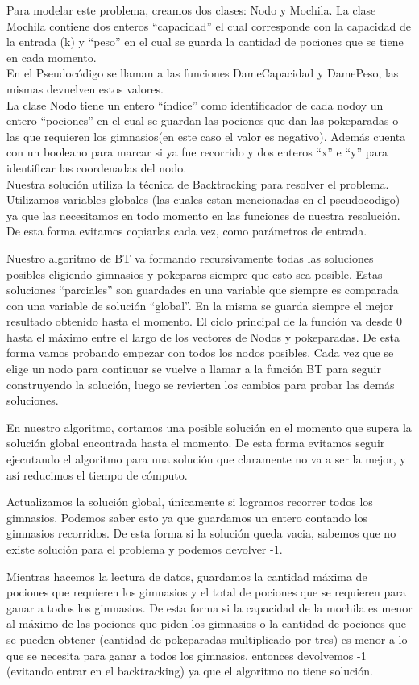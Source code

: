 \documentclass[spanish,12pt]{article}
\begin{document}
Para modelar este problema, creamos dos clases: Nodo y Mochila.
La clase Mochila contiene dos enteros ``capacidad'' el cual corresponde con la capacidad de la entrada (k) y ``peso'' en el cual se guarda la cantidad de pociones que se tiene en cada momento. 
\\
En el Pseudocódigo se llaman a las funciones DameCapacidad y DamePeso, las mismas devuelven estos valores.
\\
La clase Nodo tiene  un entero ``índice'' como identificador de cada nodoy un entero ``pociones'' en el cual se guardan las pociones que dan las pokeparadas o las que requieren los gimnasios(en este caso el valor es negativo). Además cuenta con un booleano para marcar si ya fue recorrido y dos enteros ``x'' e ``y'' para identificar las coordenadas del nodo.
\\
Nuestra solución utiliza la técnica de Backtracking para resolver el problema. Utilizamos variables globales (las cuales estan mencionadas en el pseudocodigo) ya que las necesitamos en todo momento en las funciones de nuestra resolución. De esta forma evitamos copiarlas cada vez, como parámetros de entrada.

Nuestro algoritmo de BT va formando recursivamente todas las soluciones posibles eligiendo gimnasios y pokeparas siempre que esto sea posible. Estas soluciones ``parciales'' son guardades en una variable que siempre es comparada con una variable de solución ``global''. En la misma se guarda siempre el mejor resultado obtenido hasta el momento. El ciclo principal de la función va desde 0 hasta el máximo entre el largo de los vectores de Nodos y pokeparadas. De esta forma vamos probando empezar con todos los nodos posibles. Cada vez que se elige un nodo para continuar se vuelve a llamar a la función BT para seguir construyendo la solución, luego se revierten los cambios para probar las demás soluciones. 

En nuestro algoritmo, cortamos una posible solución en el momento que supera la solución global encontrada hasta el momento. De esta forma evitamos seguir ejecutando el algoritmo para una solución que claramente no va a ser la mejor, y así reducimos el tiempo de cómputo.

Actualizamos la solución global, únicamente si logramos recorrer todos los gimnasios. Podemos saber esto ya que guardamos un entero contando los gimnasios recorridos. De esta forma si la solución queda vacia, sabemos que no existe solución para el problema y podemos devolver -1.

Mientras hacemos la lectura de datos, guardamos la cantidad máxima de pociones que requieren los gimnasios y el total de pociones que se requieren para ganar a todos los gimnasios. De esta forma si la capacidad de la mochila es menor al máximo de las pociones que piden los gimnasios o la cantidad de pociones que se pueden obtener (cantidad de pokeparadas multiplicado por tres) es menor a lo que se necesita para ganar a todos los gimnasios, entonces devolvemos -1 (evitando entrar en el backtracking) ya que el algoritmo no tiene solución. 
\end{document}

